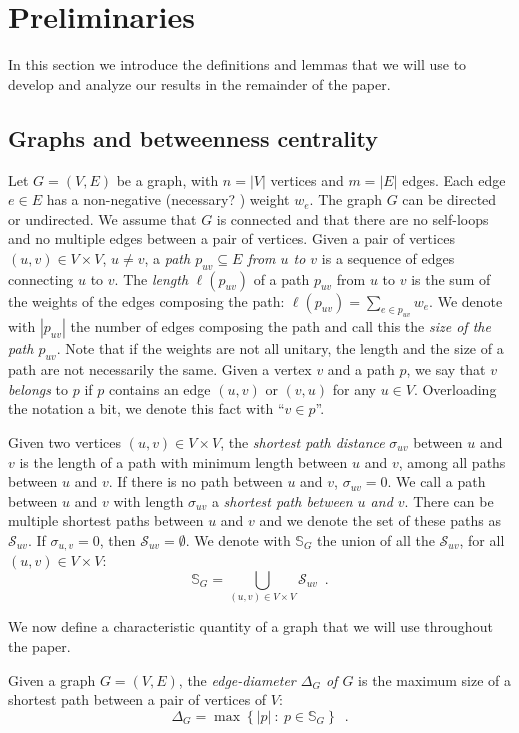 \section{Preliminaries}\label{sec:prelims}
In this section we introduce the definitions and lemmas that we will use to
develop and analyze our results in the remainder of the paper.

\subsection{Graphs and betweenness centrality}\label{sec:graphprelims}
Let $G=(V,E)$ be a graph, with $n=|V|$ vertices and $m=|E|$ edges. Each edge
$e\in E$ has a non-negative (\XXX necessary?
\MR) weight $w_e$. The graph $G$ can be directed or undirected. We assume
that $G$ is connected and that there are no self-loops and no multiple edges
between a pair of vertices. Given a pair of vertices $(u,v)\in V\times V$,
$u\neq v$, a \emph{path $p_{uv}\subseteq E$ from $u$ to $v$} is a sequence of
edges connecting $u$ to $v$. The \emph{length} $\ell(p_{uv})$ of a path $p_{uv}$
from $u$ to $v$ is the sum of the weights of the edges composing the path:
$\ell(p_{uv})=\sum_{e\in p_{uv}} w_e$. We denote with $|p_{uv}|$ the number of
edges composing the path and call this the \emph{size of the path $p_{uv}$}. Note
that if the weights are not all unitary, the length and the size of a path are
not necessarily the same. Given a vertex $v$ and a path $p$, we say that $v$
\emph{belongs} to $p$ if $p$ contains an edge $(u,v)$ or $(v,u)$ for any $u\in V$.
Overloading the notation a bit, we denote this fact with ``$v\in p$''.

Given two vertices $(u,v)\in V\times V$, the \emph{shortest path distance}
$\sigma_{uv}$ between $u$ and $v$ is the length of a path with minimum length
between $u$ and $v$, among all paths between $u$ and $v$. If there is no path
between $u$ and $v$, $\sigma_{uv}=0$. We call a path between $u$ and $v$ with
length $\sigma_{uv}$ a \emph{shortest path between $u$ and $v$}. There can be
multiple shortest paths between $u$ and $v$ and we denote the set of these paths
as $\mathcal{S}_{uv}$. If $\sigma_{u,v}=0$, then $\mathcal{S}_{uv}=\emptyset$.
We denote with $\mathbb{S}_G$ the union of all the $\mathcal{S}_{uv}$, for all
$(u,v)\in V\times V$: 
\[ \mathbb{S}_G=\bigcup_{(u,v)\in V\times V}\mathcal{S}_{uv}\enspace.\]

We now define a characteristic quantity of a graph that we will use throughout
the paper.
\begin{definition}\label{def:edgediam}
  Given a graph $G=(V,E)$, the \emph{edge-diameter $\Delta_G$ of $G$} is the
  maximum size of a shortest path between a pair of vertices of $V$:
  \[
  \Delta_G = \max\left\{|p| ~:~ p\in \mathbb{S}_G\right\}\enspace.\]
\end{definition}

